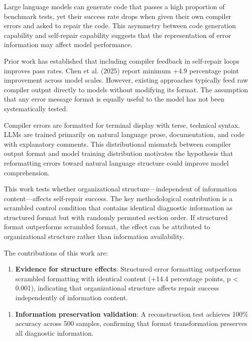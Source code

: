 
Large language models can generate code that passes a high proportion of benchmark tests, yet their success rate drops when given their own compiler errors and asked to repair the code. This asymmetry between code generation capability and self-repair capability suggests that the representation of error information may affect model performance.

Prior work has established that including compiler feedback in self-repair loops improves pass rates. Chen et al. (2025) report minimum +4.9 percentage point improvement across model scales. However, existing approaches typically feed raw compiler output directly to models without modifying its format. The assumption that any error message format is equally useful to the model has not been systematically tested.

Compiler errors are formatted for terminal display with terse, technical syntax. LLMs are trained primarily on natural language prose, documentation, and code with explanatory comments. This distributional mismatch between compiler output format and model training distribution motivates the hypothesis that reformatting errors toward natural language structure could improve model comprehension.

This work tests whether organizational structure---independent of information content---affects self-repair success. The key methodological contribution is a scrambled control condition that contains identical diagnostic information as structured format but with randomly permuted section order. If structured format outperforms scrambled format, the effect can be attributed to organizational structure rather than information availability.

The contributions of this work are:

\begin{enumerate}
\item \textbf{Evidence for structure effects}: Structured error formatting outperforms scrambled formatting with identical content (+14.4 percentage points, p < 0.001), indicating that organizational structure affects repair success independently of information content.
\end{enumerate}

\begin{enumerate}
\item \textbf{Information preservation validation}: A reconstruction test achieves 100\% accuracy across 500 samples, confirming that format transformation preserves all diagnostic information.
\end{enumerate}

